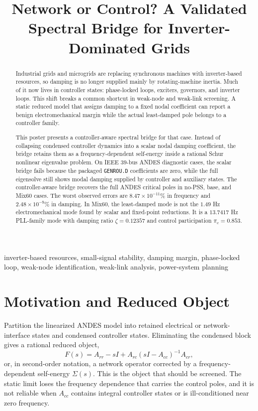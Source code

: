 \documentclass[conference]{IEEEtran}
\title{Network or Control? A Validated Spectral Bridge for Inverter-Dominated Grids}
\author{
\IEEEauthorblockN{Jorge L. Mayorga Taborda}
\IEEEauthorblockA{Universidad de los Andes, Bogot\'a, Colombia}
}
\begin{document}
\maketitle
\thispagestyle{empty}

\begin{abstract}
Industrial grids and microgrids are replacing synchronous machines with inverter-based resources, so damping is no longer supplied mainly by rotating-machine inertia. Much of it now lives in controller states: phase-locked loops, exciters, governors, and inverter loops. This shift breaks a common shortcut in weak-node and weak-link screening. A static reduced model that assigns damping to a fixed nodal coefficient can report a benign electromechanical margin while the actual least-damped pole belongs to a controller family.

This poster presents a controller-aware spectral bridge for that case. Instead of collapsing condensed controller dynamics into a scalar nodal damping coefficient, the bridge retains them as a frequency-dependent self-energy inside a rational Schur nonlinear eigenvalue problem. On IEEE 39-bus ANDES diagnostic cases, the scalar bridge fails because the packaged \texttt{GENROU.D} coefficients are zero, while the full eigensolve still shows modal damping supplied by controller and auxiliary states. The controller-aware bridge recovers the full ANDES critical poles in no-PSS, base, and Mix60 cases. The worst observed errors are \(8.47\times10^{-11}\%\) in frequency and \(2.48\times10^{-9}\%\) in damping. In Mix60, the least-damped mode is not the \(1.49\) Hz electromechanical mode found by scalar and fixed-point reductions. It is a \(13.7417\) Hz PLL-family mode with damping ratio \(\zeta=0.12357\) and control participation \(\pi_c=0.853\).
\end{abstract}

\begin{IEEEkeywords}
inverter-based resources, small-signal stability, damping margin, phase-locked loop, weak-node identification, weak-link analysis, power-system planning
\end{IEEEkeywords}

\section{Motivation and Reduced Object}

Partition the linearized ANDES model into retained electrical or network-interface states and condensed controller states. Eliminating the condensed block gives a rational reduced object,
\[
F(s)=A_{rr}-sI + A_{rc}(sI-A_{cc})^{-1}A_{cr},
\]
or, in second-order notation, a network operator corrected by a frequency-dependent self-energy \(\Sigma(s)\). This is the object that should be screened. The static limit loses the frequency dependence that carries the control poles, and it is not reliable when \(A_{cc}\) contains integral controller states or is ill-conditioned near zero frequency.
\end{document}
